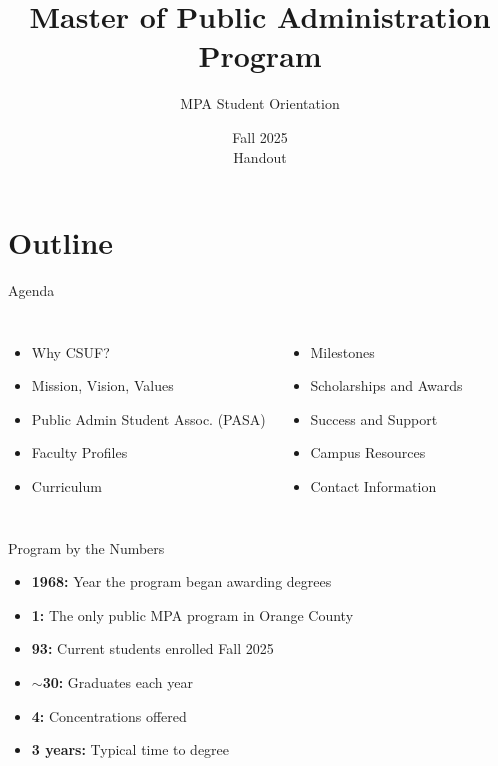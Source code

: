 \documentclass[10pt]{beamer}
\title{Master of Public Administration Program}
\subtitle{MPA Student Orientation}
\date{Fall 2025 \\ \tiny{Handout}}
\begin{document}

\maketitle

\section{\textcolor{titanorange}{Outline}}
\begin{frame}{Agenda}
\begin{columns}[T,onlytextwidth]
    \begin{itemize}\setlength{\itemsep}{2pt}
      \item Why CSUF? %
      \item Mission, Vision, Values
      \item Public Admin Student Assoc. (PASA) %
      \item Faculty Profiles
      \item Curriculum
    \end{itemize}
    \begin{itemize}\setlength{\itemsep}{2pt}
      \item Milestones
      \item Scholarships and Awards
      \item Success and Support
      \item Campus Resources
      \item Contact Information
    \end{itemize}
\end{columns}
\end{frame}

\begin{frame}{Program by the Numbers}
\begin{Large}
\begin{itemize}
  \item \textbf{1968:} Year the program began awarding degrees
  \item \textbf{1:} The only public MPA program in Orange County
  \item \textbf{93:} Current students enrolled Fall 2025
  \item \textbf{\(\sim\)30:} Graduates each year
  \item \textbf{4:} Concentrations offered
  \item \textbf{3 years:} Typical time to degree
\end{itemize}
\end{Large}
\end{frame}
\end{document}
